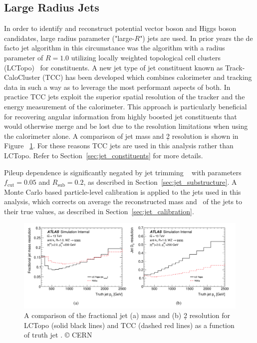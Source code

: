\subsection{Large Radius Jets}
\label{sec:tccjets}
In order to identify and reconstruct potential vector boson and Higgs boson candidates, large radius parameter ("large-$R$") jets are used.
In prior years the de facto jet algorithm in this circumstance was the \akt algorithm with a radius parameter of $R=1.0$ utilizing locally weighted topological cell clusters (LCTopo)~\cite{PERF-2014-07} for constituents.
A new jet type of jet constituent known as Track-CaloCluster (TCC) has been developed \cite{ATL-PHYS-PUB-2017-015} which combines calorimeter and tracking data in such a way as to leverage the most performant aspects of both.
In practice TCC jets exploit the superior spatial resolution of the tracker and the energy measurement of the calorimeter.
This approach is particularly beneficial for recovering angular information from highly boosted jet constituents that would otherwise merge and be lost due to the resolution limitations when using the calorimeter alone.
A comparison of jet mass and \d2 resolution is shown in Figure ~\ref{fig:tcc_lctopo_res}.
For these reasons TCC jets are used in this analysis rather than LCTopo.
Refer to Section~\ref{sec:jet_constituents} for more details.

Pileup dependence is significantly negated by jet trimming ~\cite{Krohn:2009th} with parameters $f_{\mathrm{cut}} = 0.05$ and $R_{\mathrm{sub}} = 0.2$, as described in Section~\ref{sec:jet_substructure}.
A Monte Carlo based particle-level calibration is applied to the jets used in this analysis, which corrects on average the reconstructed mass and \pt\ of the jets to their true values, as described in Section~\ref{sec:jet_calibration}.

\begin{figure}[htbp!]
\begin{center}
\includegraphics[width=\textwidth]{TCC_LCTopo_Mass_D2_resolution.png}
\end{center}
\caption{A comparison of the fractional jet (a) mass and (b) \d2 resolution for LCTopo (solid black lines) and TCC (dashed red lines) as a function of truth jet \pt. © CERN}
\label{fig:tcc_lctopo_res}
\end{figure}

